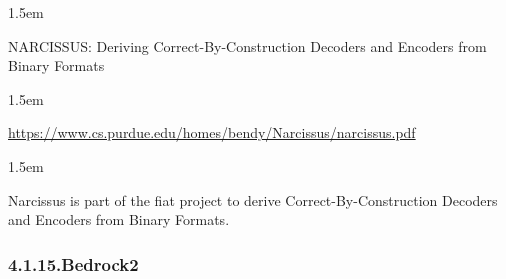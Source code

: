 \documentclass[12pt,twoside]{article}
\begin{document}
\begin{mddefinitions}

\begin{mdbmarginx}{}{}{}{1.5em}%
\begin{mddefdata}%
NARCISSUS: Deriving Correct-By-Construction Decoders and Encoders from Binary Formats
\end{mddefdata}%
\end{mdbmarginx}%

\begin{mdbmarginx}{}{}{}{1.5em}%
\begin{mddefdata}%
\href{https://www.cs.purdue.edu/homes/bendy/Narcissus/narcissus.pdf}{{\ttfamily https://\hspace{0pt}www.\hspace{0pt}cs.\hspace{0pt}purdue.\hspace{0pt}edu/\hspace{0pt}homes/\hspace{0pt}bendy/\hspace{0pt}Narcissus/\hspace{0pt}narcissus.\hspace{0pt}pdf}}
\end{mddefdata}%
\end{mdbmarginx}%


\begin{mdbmarginx}{}{}{}{1.5em}%
\begin{mddefdata}%
\end{mddefdata}%
\end{mdbmarginx}%
\end{mddefinitions}%

\noindent{}Narcissus is part of the fiat project to derive
Correct-By-Construction Decoders and Encoders from Binary Formats.%

\subsubsection{4.1.15.\hspace*{0.5em}Bedrock2}%
\end{document}
